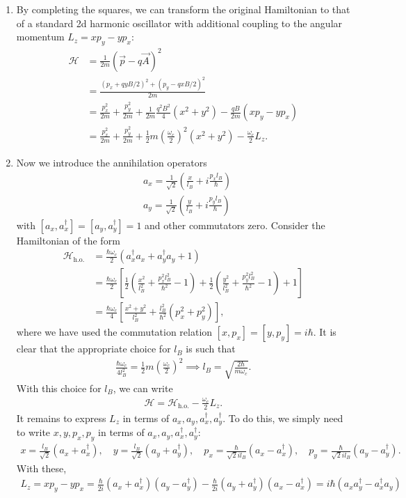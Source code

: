 \documentclass{article}
\theoremstyle{definition}
\newcommand{\ham}{\mathcal{H}}
\newcommand{\f}[2]{\frac{#1}{#2}}
\newcommand{\lp}{\left(}
\newcommand{\rp}{\right)}
\newcommand{\lb}{\left[}
\newcommand{\rb}{\right]}
\begin{document}
\begin{enumerate}[label=\alph*)]
	
	\item By completing the squares, we can transform the original Hamiltonian to that of a standard 2d harmonic oscillator with additional coupling to the angular momentum $L_z = xp_y - yp_x$:
	\begin{align*}
		\ham 
		&= \f{1}{2m}\lp \vec{p} - q\vec{A} \rp^2 \\
		&=  \f{({p}_x + q yB/2)^2 + ({p}_y - q x B/2)^2}{2m} \\
		&= \f{p_x^2}{2m} + \f{p_y^2}{2m} + \f{1}{2m}\f{q^2B^2}{4}(x^2 + y^2) - \f{qB}{2m} (xp_y - yp_x)\\
		&= \f{p_x^2}{2m} + \f{p_y^2}{2m} + \f{1}{2} m \lp \f{\omega_c}{2} \rp^2 (x^2 + y^2) - \f{\omega_c}{2}L_z.
	\end{align*}
	
	\item Now we introduce the annihilation operators
	\begin{align*}
		&a_x = \f{1}{\sqrt{2}}\lp \f{x}{l_B} + i \f{p_x l_B}{\hbar} \rp \\ 
		&a_y = \f{1}{\sqrt{2}}\lp \f{y}{l_B} + i \f{p_y l_B}{\hbar} \rp
	\end{align*}
	with $[a_x,a^\dagger_x] = [a_y,a^\dagger_y] = 1$  and other commutators zero. Consider the Hamiltonian of the form 
	\begin{align*}
		\ham_{\text{h.o.}} 
		&= \f{\hbar \omega_c}{2} \lp a_x^\dagger a_x + a_y^\dagger a_y + 1 \rp\\
		&= \f{\hbar \omega_c}{2} \lb \f{1}{2}\lp \f{x^2}{l_B^2} + \f{p_x^2 l_B^2}{\hbar^2} - 1 \rp + \f{1}{2}\lp \f{y^2}{l_B^2} + \f{p_y^2 l_B^2}{\hbar^2} -1 \rp + 1 \rb \\ 
		&= \f{\hbar \omega_c}{4}\lb \f{x^2 + y^2}{l_B^2} + \f{l_B^2}{\hbar^2}(p_x^2 + p_y^2) \rb,
	\end{align*}
	where we have used the commutation relation $[x,p_x] = [y,p_y] = i\hbar$. It is clear that the appropriate choice for $l_B$ is such that
	\begin{align*}
		\f{\hbar \omega_c}{4l_B^2} = \f{1}{2}m\lp \f{\omega_c}{2} \rp^2 \implies l_B = \sqrt{\f{2\hbar }{m\omega_c}}.
	\end{align*}
	With this choice for $l_B$, we can write
	\begin{align*}
		\ham = \ham_\text{h.o.} - \f{\omega_c}{2}L_z.
	\end{align*}
	It remains to express $L_z$ in terms of $a_x,a_y,a_x^\dagger, a_y^\dagger$. To do this, we simply need to write $x,y,p_x,p_y$ in terms of $a_x,a_y,a_x^\dagger, a_y^\dagger$:
	\begin{align*}
		x = \f{l_B}{\sqrt{2}}\lp a_x + a_x^\dagger \rp, \quad y = \f{l_B}{\sqrt{2}}\lp a_y + a_y^\dagger \rp, \quad 
		p_x = \f{\hbar}{\sqrt{2} il_B} \lp a_x - a_x^\dagger \rp, \quad p_y = \f{\hbar}{\sqrt{2} il_B} \lp a_y - 		a_y^\dagger\rp.
	\end{align*}
	With these,
	\begin{align*}
		L_z = xp_y - yp_x = \f{\hbar}{2i}\lp a_x + a_x^\dagger \rp\lp a_y - a_y^\dagger\rp - \f{\hbar}{2i}\lp a_y + a_y^\dagger \rp \lp a_x - a_x^\dagger \rp = i\hbar(a_xa_y^\dagger - a_x^\dagger a_y)
	\end{align*}
	

\end{enumerate}
\end{document}
